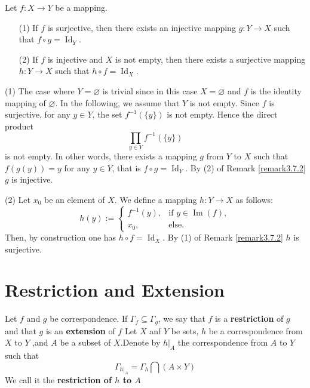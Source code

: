 \documentclass{book}
\numberwithin{equation}{section}
\begin{document}
\begin{propositionenv}
\label{prop:direct-product-factorization}
Let $f : X \to Y$ be a mapping.
\begin{enumerate}
    \item[(1)] If $f$ is surjective, then there exists an injective mapping $g : Y \to X$ such that $f \circ g = \operatorname{Id}_Y$.
    \item[(2)] If $f$ is injective and $X$ is not empty, then there exists a surjective mapping $h : Y \to X$ such that $h \circ f = \operatorname{Id}_X$.
\end{enumerate}
\end{propositionenv}

\begin{proofenv}
(1) The case where $Y = \varnothing$ is trivial since in this case $X = \varnothing$ and $f$ is the identity mapping of $\varnothing$. In the following, we assume that $Y$ is not empty. Since $f$ is surjective, for any $y \in Y$, the set $f^{-1}(\{y\})$ is not empty. Hence the direct product
\[
\prod_{y \in Y} f^{-1}(\{y\})
\]
is not empty. In other words, there exists a mapping $g$ from $Y$ to $X$ such that $f(g(y)) = y$ for any $y \in Y$, that is $f \circ g = \operatorname{Id}_Y$. By (2) of Remark \ref{remark3.7.2} $g$ is injective.

(2) Let $x_0$ be an element of $X$. We define a mapping $h : Y \to X$ as follows:
\[
h(y) := 
\begin{cases}
f^{-1}(y), & \text{if } y \in \operatorname{Im}(f), \\
x_0, & \text{else}.
\end{cases}
\]
Then, by construction one has $h \circ f = \operatorname{Id}_X$. 
\newline
By (1) of Remark \ref{remark3.7.2} $h$ is surjective.
\end{proofenv}
\section{Restriction and Extension}
\begin{definitionenv}
    Let $f$ and $g$ be correspondence. If $\Gamma _f\subseteq \Gamma _g$, we say that $f$ is a \textbf{restriction} of $g$ and that $g$ is an \textbf{extension} of $f$
    \newline
    Let $X$ anf $Y$ be sets, $h$ be a correspondence from $X$ to $Y$ ,and $A$ be a subset of $X$.Denote by $h|_A$ the correspondence from $A$ to $Y$ such that$$\Gamma_{h|_A}=\Gamma_h\bigcap (A\times Y)$$ We call it the \textbf{restriction of $h$ to $A$}
\end{definitionenv}
\end{document}
